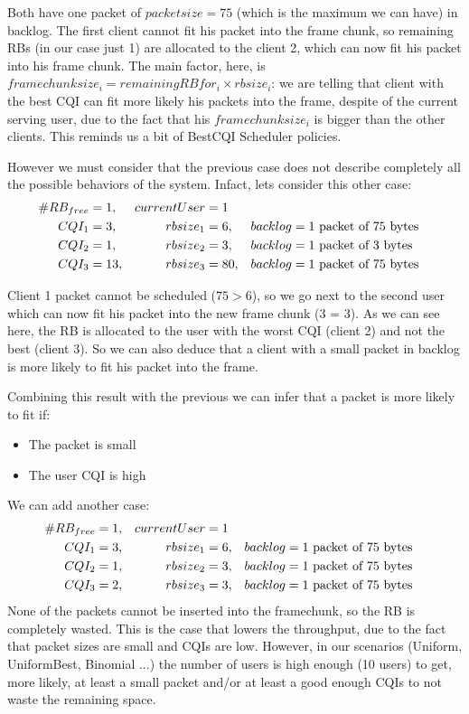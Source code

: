 Both have one packet of \(packetsize=75\) (which is the maximum we can have) in backlog. The first client cannot fit his packet into the frame chunk, so remaining RBs (in our case just 1) are allocated to the client 2, which can now fit his packet into his frame chunk. The main factor, here, is \(framechunksize_i = remainingRBfor_i \times rbsize_i\): we are telling that client with the best CQI can fit more likely his packets into the frame, despite of the current serving user, due to the fact that his \(framechunksize_i\) is bigger than the other clients. This reminds us a bit of BestCQI Scheduler policies.

However we must consider that the previous case does not describe completely all the possible behaviors of the system. Infact, lets consider this other case:
\begin{align}
	\#RB_{free} &= 1, &currentUser &= 1 \nonumber \\ 
	CQI_1 &= 3, &rbsize_1 &= 6, & backlog &= \textnormal{1 packet of 75 bytes} \nonumber \\
	CQI_2 &= 1, &rbsize_2 &= 3, &backlog &= \textnormal{1 packet of 3 bytes} \nonumber \\
	CQI_3 &= 13, &rbsize_3 &= 80, &backlog &= \textnormal{1 packet of 75 bytes} \nonumber 
\end{align}

Client 1 packet cannot be scheduled (\(75 > 6\)), so we go next to the second user which can now fit his packet into the new frame chunk (3 = 3). As we can see here, the RB is allocated to the user with the worst CQI (client 2) and not the best (client 3). So we can also deduce that a client with a small packet in backlog is more likely to fit his packet into the frame.

Combining this result with the previous we can infer that a packet is more likely to fit if:
\begin{itemize}
	\item The packet is small
	\item The user CQI is high
\end{itemize}
We can add another case:
\begin{align}
	\#RB_{free} &= 1, &currentUser &= 1 \nonumber \\
	CQI_1 &= 3, &rbsize_1 &= 6, &backlog &= \textnormal{1 packet of 75 bytes} \nonumber\\
	CQI_2 &= 1, &rbsize_2 &= 3, &backlog &= \textnormal{1 packet of 75 bytes} \nonumber\\
	CQI_3 &= 2, &rbsize_3 &= 3, &backlog &= \textnormal{1 packet of 75 bytes} \nonumber
\end{align}
None of the packets cannot be inserted into the framechunk, so the RB is completely wasted. This is the case that lowers the throughput, due to the fact that packet sizes are small and CQIs are low. However, in our scenarios (Uniform, UniformBest, Binomial ...) the number of users is high enough (10 users) to get, more likely, at least a small packet and/or at least a good enough CQIs to not waste the remaining space.

